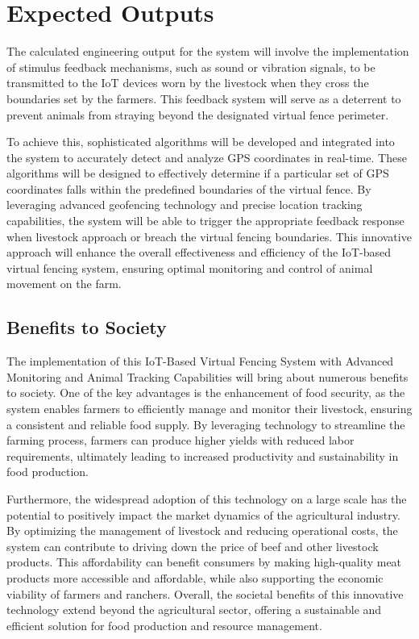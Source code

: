 \documentclass[conference]{main}
\begin{document}


\section{Expected Outputs}

The calculated engineering output for the system will involve the implementation
of stimulus feedback mechanisms, such as sound or vibration signals, to be
transmitted to the IoT devices worn by the livestock when they cross the
boundaries set by the farmers. This feedback system will serve as a deterrent to
prevent animals from straying beyond the designated virtual fence perimeter.

To achieve this, sophisticated algorithms will be developed and integrated into
the system to accurately detect and analyze GPS coordinates in real-time. These
algorithms will be designed to effectively determine if a particular set of GPS
coordinates falls within the predefined boundaries of the virtual fence. By
leveraging advanced geofencing technology and precise location tracking
capabilities, the system will be able to trigger the appropriate feedback
response when livestock approach or breach the virtual fencing boundaries. This
innovative approach will enhance the overall effectiveness and efficiency of the
IoT-based virtual fencing system, ensuring optimal monitoring and control of
animal movement on the farm.



\subsection{Benefits to Society}

The implementation of this IoT-Based Virtual Fencing System with
Advanced Monitoring and Animal Tracking Capabilities will bring about numerous
benefits to society. One of the key advantages is the enhancement of food
security, as the system enables farmers to efficiently manage and monitor their
livestock, ensuring a consistent and reliable food supply. By leveraging
technology to streamline the farming process, farmers can produce higher yields
with reduced labor requirements, ultimately leading to increased productivity
and sustainability in food production.

Furthermore, the widespread adoption of this technology on a large scale has the
potential to positively impact the market dynamics of the agricultural industry.
By optimizing the management of livestock and reducing operational costs, the
system can contribute to driving down the price of beef and other livestock
products. This affordability can benefit consumers by making high-quality meat
products more accessible and affordable, while also supporting the economic
viability of farmers and ranchers. Overall, the societal benefits of this
innovative technology extend beyond the agricultural sector, offering a
sustainable and efficient solution for food production and resource management.
\end{document}
